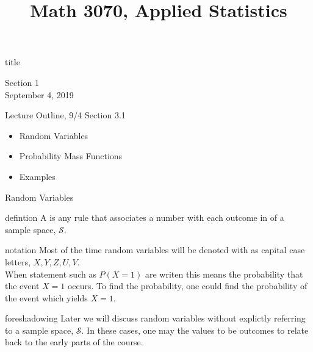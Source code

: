 \documentclass[]{beamer}
\title{Math 3070, Applied Statistics}
\newcommand{\nl}[1]{\vspace{#1 em}}
\begin{document}
\begin{frame}
    \begin{beamercolorbox}[rounded=true,wd=\textwidth,center]{title}
        \inserttitle
    \end{beamercolorbox}
    \begin{center}
        Section 1\\
        \nl{0.5}
        September 4, 2019
    \end{center}

\end{frame}

\begin{frame}{Lecture Outline, 9/4}
    Section 3.1
    \begin{itemize}
        \item Random Variables
        \item Probability Mass Functions
        \item Examples
    \end{itemize}
\end{frame}

\begin{frame}{Random Variables}
    \begin{block}{defintion}
    A  is any rule that associates a number with each outcome in of a sample space, $\mathcal{S}$.
    \end{block}
    \begin{block}{notation}
        Most of the time random variables will be denoted with as capital case letters, $X,Y,Z,U,V$.\\
        \nl{0.5}
        When statement such as  $P(X=1)$ are writen this means the probability that the event $X=1$ occurs. To find the probability, one could find the probability of the event which yields $X=1$.
    \end{block}
    \begin{block}{foreshadowing}
        Later we will discuss random variables without explictly referring to a sample space, $\mathcal{S}$. In these cases, one may the values to be outcomes to relate back to the early parts of the course.
    \end{block}
\end{frame}
\end{document}
